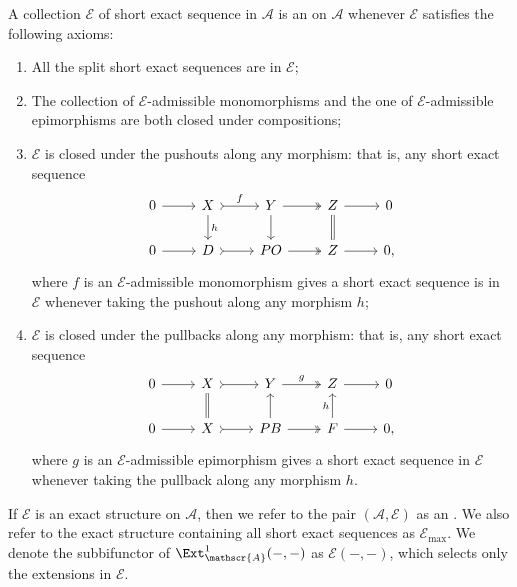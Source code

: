 \begin{definition}\label{def:exact}
A collection $\mathcal{E}$ of short exact sequence in $\mathscr{A}$ is an  on $\mathscr{A}$ whenever $\mathcal{E}$ satisfies the following axioms:
\begin{enumerate}[label=$(\mathsf{ES} \arabic*)$,itemsep=1mm]
    \item All the split short exact sequences are in $\mathcal{E}$;
  
    \item The collection of $\mathcal{E}$-admissible monomorphisms and the one of $\mathcal{E}$-admissible epimorphisms are both closed under compositions;
    
    \item $\mathcal{E}$ is closed under the pushouts along any morphism: that is, any short exact sequence \[\begin{tikzcd}
	0 & X & Y & Z & 0 \\ 0 & D & PO & Z & 0 ,
	\arrow[from=1-1, to=1-2]
	\arrow["f",tail, from=1-2, to=1-3]
	\arrow[two heads,from=1-3, to=1-4]
	\arrow[from=1-4, to=1-5]
    \arrow[from=2-1, to=2-2]
	\arrow[tail, from=2-2, to=2-3]
	\arrow[two heads,from=2-3, to=2-4]
	\arrow[from=2-4, to=2-5]
    \arrow["h",from=1-2, to=2-2]
	\arrow[from=1-3, to=2-3]
    \arrow[equal,from=1-4, to=2-4]
 \end{tikzcd} \] where $f$ is an $\mathcal{E}$-admissible monomorphism gives a short exact sequence is in $\mathcal{E}$ whenever taking the pushout along any morphism $h$;
    
\item $\mathcal{E}$ is closed under the pullbacks along any morphism: that is, any short exact sequence \[\begin{tikzcd}
	0 & X & Y & Z & 0 \\ 0 & X & PB & F & 0 ,
	\arrow[from=1-1, to=1-2]
	\arrow[tail, from=1-2, to=1-3]
	\arrow["g",two heads,from=1-3, to=1-4]
	\arrow[from=1-4, to=1-5]
    \arrow[from=2-1, to=2-2]
	\arrow[tail, from=2-2, to=2-3]
	\arrow[two heads,from=2-3, to=2-4]
	\arrow[from=2-4, to=2-5]
    \arrow[equal,from=1-2, to=2-2]
	\arrow[from=2-3, to=1-3]
    \arrow["h",from=2-4, to=1-4]
 \end{tikzcd} \]where $g$ is an $\mathcal{E}$-admissible epimorphism gives a short exact sequence in $\mathcal{E}$ whenever taking the pullback along any morphism $h$.
\end{enumerate}
If $\mathcal{E}$ is an exact structure on $\mathscr{A}$, then we refer to the pair $(\mathscr{A},\mathcal{E})$ as an . We also refer to the exact structure containing all short exact sequences as $\mathcal{E}_{\max}$. We denote the subbifunctor of $\Ext^1_\mathscr{A}(-,-)$ as $\mathcal{E}(-,-)$, which selects only the extensions in $\mathcal{E}$. 
\end{definition}

